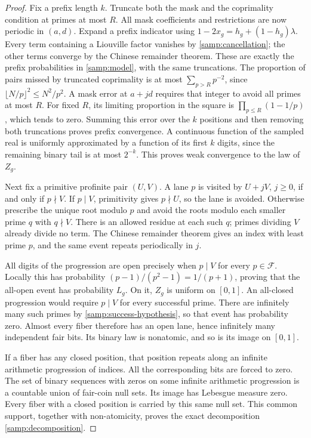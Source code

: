 \begin{proof}
Fix a prefix length $k$.  Truncate both the mask and the coprimality
condition at primes at most $R$.  All mask coefficients and
restrictions are now periodic in $(a,d)$.  Expand a prefix indicator
using $1-2x_g=h_g+(1-h_g)\lambda$.  Every term containing a
Liouville factor vanishes by \eqref{samp:cancellation}; the other
terms converge by the Chinese remainder theorem.  These are exactly
the prefix probabilities in \eqref{samp:model}, with the same
truncations.  The proportion of pairs missed by truncated
coprimality is at most $\sum_{p>R}p^{-2}$, since
$\lfloor N/p\rfloor^2\le N^2/p^2$.  A mask error at $a+jd$
requires that integer to avoid all primes at most $R$.  For fixed
$R$, its limiting proportion in the square is
$\prod_{p\le R}(1-1/p)$, which tends to zero.  Summing this error
over the $k$ positions and then removing both truncations proves
prefix convergence.  A continuous function of the sampled real is
uniformly approximated by a function of its first $k$ digits, since
the remaining binary tail is at most $2^{-k}$.  This proves weak
convergence to the law of $Z_g$.

Next fix a primitive profinite pair $(U,V)$.  A lane $p$ is visited
by $U+jV$, $j\ge0$, if and only if $p\nmid V$.  If $p\mid V$,
primitivity gives $p\nmid U$, so the lane is avoided.  Otherwise
prescribe the unique root modulo $p$ and avoid the roots modulo
each smaller prime $q$ with $q\nmid V$.  There is an allowed residue
at each such $q$; primes dividing $V$ already divide no term.
The Chinese remainder theorem gives an index with least prime $p$,
and the same event repeats periodically in $j$.

All digits of the progression are open precisely when $p\mid V$
for every $p\in\mathcal F$.  Locally this has probability
$(p-1)/(p^2-1)=1/(p+1)$, proving that the all-open event has
probability $L_g$.  On it, $Z_g$ is uniform on $[0,1]$.
An all-closed progression would require $p\mid V$ for every
successful prime.  There are infinitely many such primes by
\eqref{samp:success-hypothesis}, so that event has probability zero.
Almost every fiber therefore has an open lane, hence infinitely many
independent fair bits.  Its binary law is nonatomic, and so is its
image on $[0,1]$.

If a fiber has any closed position, that position repeats along an
infinite arithmetic progression of indices.  All the corresponding
bits are forced to zero.  The set of binary sequences with zeros on
some infinite arithmetic progression is a countable union of
fair-coin null sets.  Its image has Lebesgue measure zero.  Every
fiber with a closed position is carried by this same null set.
This common support, together with non-atomicity, proves the exact
decomposition \eqref{samp:decomposition}.


\end{proof}
